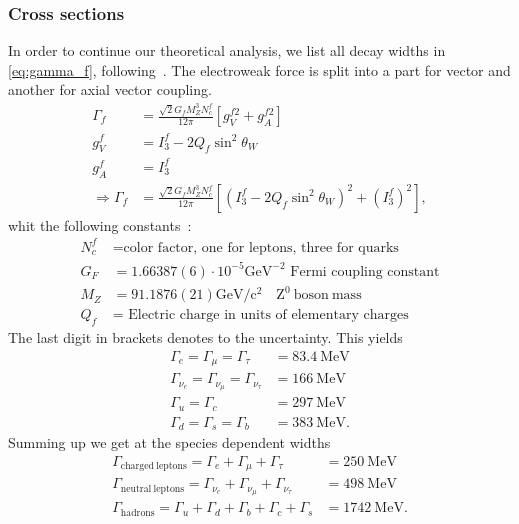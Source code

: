 \subsubsection{Cross sections}
\label{sub:cross_sections}
In order to continue our theoretical analysis, we list all decay widths in \eqref{eq:gamma_f},
following~\cite{ver}.
The electroweak force is split into a part for vector and another for axial vector coupling. 
\begin{align*}
    \Gamma_f &= \frac{\sqrt{2} G_f M_Z^3 N_c^f}{12 \pi} \left[ g_V^{f2} + g_A^{f2} \right] \\
       g_V^f &= I_3^f - 2 Q_f \sin^2 \theta_W \\
       g_A^f &= I_3^f \\
\Rightarrow \Gamma_f &= \frac{\sqrt{2} G_f M_Z^3 N_c^f}{12 \pi} \left[ (I_3^f - 2 Q_f \sin^2 \theta_W)^2 + (I_3^f)^2  \right],
\end{align*}
whit the following constants~\cite{pdg}: 
\begin{align*}
\label{eq:consts}
    N_c^f &= \text{color factor, one for leptons, three for quarks}  \\
    G_F &= 1.66387(6) \cdot 10^{-5} \mathrm{GeV^{-2}} \text{ Fermi coupling constant} \\
    M_Z &= 91.1876(21) \mathrm{GeV /c^{2}} \quad \mathrm{Z^0 \: boson \: mass} \\
    Q_f &= \text{ Electric charge in units of elementary charges}
\end{align*}
The last digit in brackets denotes to the uncertainty.
This yields
\begin{align*}
    \Gamma_e = \Gamma_\mu = \Gamma_\tau &= 83.4 \: \mathrm{MeV}   \\
    \Gamma_{\nu_e} = \Gamma_{\nu_\mu} = \Gamma_{\nu_\tau} &= 166 \: \mathrm{MeV}  \\
    \Gamma_u = \Gamma_c &= 297 \: \mathrm{MeV} \\
    \Gamma_d = \Gamma_s = \Gamma_b &= 383 \: \mathrm{MeV} .
\end{align*}
Summing up we get at the species dependent widths
\begin{align*}
    \Gamma_{\mathrm{charged \: leptons}} = \Gamma_e + \Gamma_\mu + \Gamma_\tau &= 250\: \mathrm{MeV} \\
    \Gamma_{\mathrm{neutral \: leptons}} = \Gamma_{\nu_e} + \Gamma_{\nu_\mu} + \Gamma_{\nu_\tau} &= 498 \: \mathrm{MeV} \\
    \Gamma_{\mathrm{hadrons}} = \Gamma_u + \Gamma_d + \Gamma_b + \Gamma_c + \Gamma_s &= 1742 \: \mathrm{MeV} .
\end{align*}
